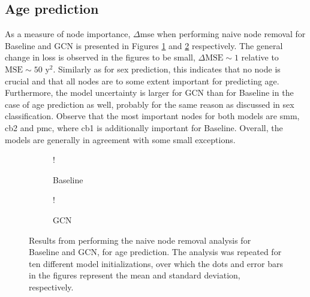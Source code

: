 \subsection{Age prediction}
As a measure of node importance, $\Delta$\acrshort{mse} when performing naive node removal for Baseline and GCN is presented in Figures \ref{fig:naive_age_baseline} and \ref{fig:naive_age_gcn} respectively. The general change in loss is observed in the figures to be small, $\Delta\text{MSE}\sim1$ relative to $\text{MSE}\sim50\text{ y}^2$. Similarly as for sex prediction, this indicates that no node is crucial and that all nodes are to some extent important for predicting age. Furthermore, the model uncertainty is larger for GCN than for Baseline in the case of age prediction as well, probably for the same reason as discussed in sex classification. Observe that the most important nodes for both models are \acrshort{smm}, \acrshort{cb2} and \acrshort{pmc}, where \acrshort{cb1} is additionally important for Baseline. Overall, the models are generally in agreement with some small exceptions. 
\begin{figure}[!htbp]
    \centering
        \begin{subfigure}{.5\textwidth}
            \centering
            \begin{center}
                \resizebox {1.0\linewidth} {!} {
                    
                }
            \end{center}
            \caption{Baseline}
            \label{fig:naive_age_baseline}
        \end{subfigure}%
        \begin{subfigure}{.5\textwidth}
            \centering
            \begin{center}
                \resizebox {1.0\linewidth} {!} {
                    
                }
            \end{center}
            \caption{GCN}
            \label{fig:naive_age_gcn}
        \end{subfigure}
    \caption{Results from performing the naive node removal analysis for Baseline and GCN, for age prediction. The analysis was repeated for ten different model initializations, over which the dots and error bars in the figures represent the mean and standard deviation, respectively.}
    \label{fig:naive_age}
\end{figure}
